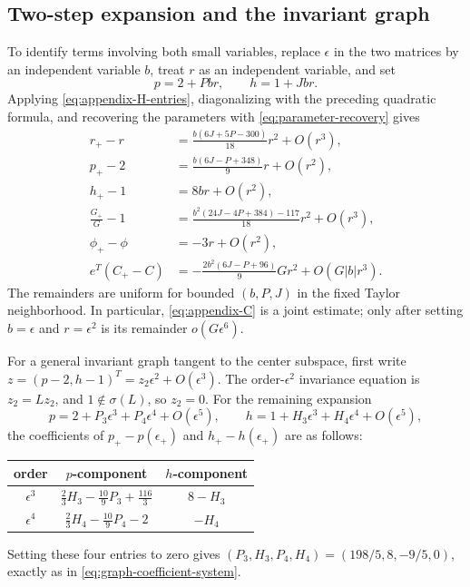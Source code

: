 \documentclass[11pt]{article}
\begin{document}
\subsection{Two-step expansion and the invariant graph}

To identify terms involving both small variables, replace $\epsilon$ in the
two matrices by an independent variable $b$, treat $r$ as an independent
variable, and set
\[
p=2+Pbr,\qquad h=1+Jbr.
\]
Applying \eqref{eq:appendix-H-entries}, diagonalizing with the preceding
quadratic formula, and recovering the parameters with
\eqref{eq:parameter-recovery} gives
\begin{align}
r_+-r
 &=\frac{b(6J+5P-300)}{18}r^2+O(r^3),
\label{eq:appendix-r}\\
p_+-2
 &=\frac{b(6J-P+348)}9r+O(r^2),
\label{eq:appendix-p}\\
h_+-1&=8br+O(r^2),
\label{eq:appendix-h}\\
\frac{G_+}{G}-1
 &=\frac{b^2(24J-4P+384)-117}{18}r^2+O(r^3),
\label{eq:appendix-G}\\
\phi_+-\phi&=-3r+O(r^2),
\label{eq:appendix-phi}\\
e^T(C_+-C)
 &=-\frac{2b^2(6J-P+96)}9Gr^2+O(G|b|r^3).
\label{eq:appendix-C}
\end{align}
The remainders are uniform for bounded $(b,P,J)$ in the fixed Taylor
neighborhood.  In particular, \eqref{eq:appendix-C} is a joint estimate; only
after setting $b=\epsilon$ and $r=\epsilon^2$ is its remainder
$o(G\epsilon^6)$.



For a general invariant graph tangent to the center subspace, first write
$z=(p-2,h-1)^T=z_2\epsilon^2+O(\epsilon^3)$.  The order-$\epsilon^2$
invariance equation is $z_2=Lz_2$, and $1\notin\sigma(L)$, so $z_2=0$.
For the remaining expansion
\[
p=2+P_3\epsilon^3+P_4\epsilon^4+O(\epsilon^5),\qquad
h=1+H_3\epsilon^3+H_4\epsilon^4+O(\epsilon^5),
\]
the coefficients of $p_+-p(\epsilon_+)$ and
$h_+-h(\epsilon_+)$ are as follows:
\begin{center}
\begin{tabular}{c@{\qquad}c@{\qquad}c}
\toprule
order & $p$-component & $h$-component\\
\midrule
$\epsilon^3$ & $\frac23H_3-\frac{10}{9}P_3+\frac{116}{3}$
              & $8-H_3$\\[2pt]
$\epsilon^4$ & $\frac23H_4-\frac{10}{9}P_4-2$
              & $-H_4$\\
\bottomrule
\end{tabular}
\end{center}
Setting these four entries to zero gives
$(P_3,H_3,P_4,H_4)=(198/5,8,-9/5,0)$, exactly as in
\eqref{eq:graph-coefficient-system}.
\end{document}
